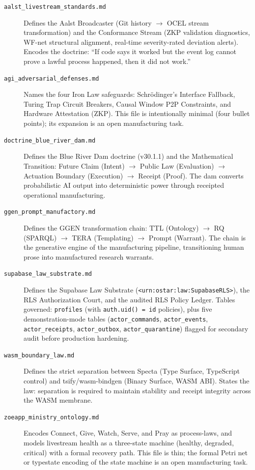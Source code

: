 \begin{description}
  \item[\texttt{aalst\_livestream\_standards.md}] Defines the Aalst Broadcaster
        (Git history $\to$ OCEL stream transformation) and the Conformance Stream
        (ZKP validation diagnostics, WF-net structural alignment, real-time
        severity-rated deviation alerts). Encodes the doctrine: ``If code says it
        worked but the event log cannot prove a lawful process happened, then it
        did not work.''

  \item[\texttt{agi\_adversarial\_defenses.md}] Names the four Iron Law
        safeguards: Schr\"odinger's Interface Fallback, Turing Trap Circuit
        Breakers, Causal Window P2P Constraints, and Hardware Attestation (ZKP).
        This file is intentionally minimal (four bullet points); its expansion
        is an open manufacturing task.

  \item[\texttt{doctrine\_blue\_river\_dam.md}] Defines the Blue River Dam
        doctrine (v30.1.1) and the Mathematical Transition:
        Future Claim (Intent) $\to$ Public Law (Evaluation) $\to$ Actuation
        Boundary (Execution) $\to$ Receipt (Proof). The dam converts
        probabilistic AI output into deterministic power through receipted
        operational manufacturing.

  \item[\texttt{ggen\_prompt\_manufactory.md}] Defines the GGEN transformation
        chain: TTL (Ontology) $\to$ RQ (SPARQL) $\to$ TERA (Templating) $\to$
        Prompt (Warrant). The chain is the generative engine of the manufacturing
        pipeline, transitioning human prose into manufactured research warrants.

  \item[\texttt{supabase\_law\_substrate.md}] Defines the Supabase Law Substrate
        (\texttt{<urn:ostar:law:SupabaseRLS>}), the RLS Authorization Court, and
        the audited RLS Policy Ledger. Tables governed: \texttt{profiles} (with
        \texttt{auth.uid() = id} policies), plus five demonstration-mode tables
        (\texttt{actor\_commands}, \texttt{actor\_events},
        \texttt{actor\_receipts}, \texttt{actor\_outbox},
        \texttt{actor\_quarantine}) flagged for secondary audit before production
        hardening.

  \item[\texttt{wasm\_boundary\_law.md}] Defines the strict separation between
        Specta (Type Surface, TypeScript control) and tsify/wasm-bindgen (Binary
        Surface, WASM ABI). States the law: separation is required to maintain
        stability and receipt integrity across the WASM membrane.

  \item[\texttt{zoeapp\_ministry\_ontology.md}] Encodes Connect, Give, Watch,
        Serve, and Pray as process-laws, and models livestream health as a
        three-state machine (healthy, degraded, critical) with a formal recovery
        path. This file is thin; the formal Petri net or typestate encoding of
        the state machine is an open manufacturing task.
\end{description}

